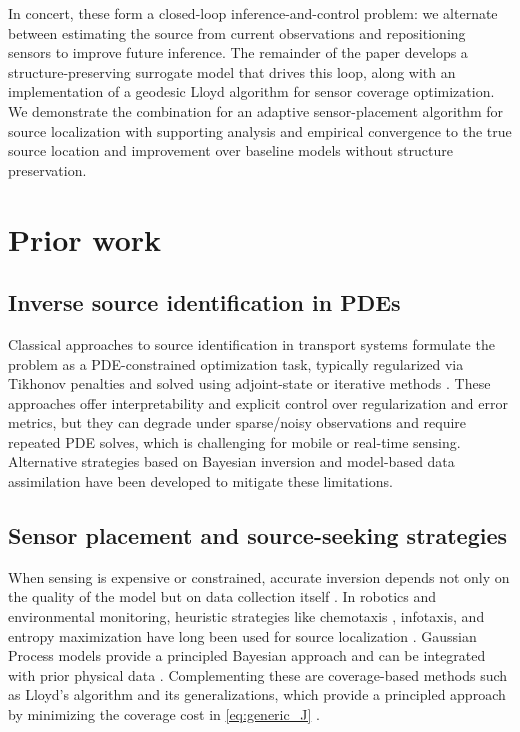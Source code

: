 \documentclass[onefignum,onetabnum]{siamart171218} %
\begin{document}
\noindent In concert, these form a closed-loop inference-and-control problem: we alternate between estimating the source from current observations and repositioning sensors to improve future inference. The remainder of the paper develops a structure-preserving surrogate model that drives this loop, along with an implementation of a geodesic Lloyd algorithm \cite{lloyd1982least, cortes2004coverage} for sensor coverage optimization. We demonstrate the combination for an adaptive sensor-placement algorithm for source localization with supporting analysis and empirical convergence to the true source location and improvement over baseline models without structure preservation.
\section{Prior work}
\label{sec:background}

\subsection{Inverse source identification in PDEs}
\label{sec:background_si}

Classical approaches to source identification in transport systems formulate the problem as a PDE-constrained optimization task, typically regularized via Tikhonov penalties and solved using adjoint-state or iterative methods \cite{chavent2010nonlinear, bakushinsky2005iterative}. These approaches offer interpretability and explicit control over regularization and error metrics, but they can degrade under sparse/noisy observations and require repeated PDE solves, which is challenging for mobile or real-time sensing. Alternative strategies based on Bayesian inversion \cite{tarantola2005inverse, stuart2010inverse} and model-based data assimilation \cite{alpay2000model} have been developed to mitigate these limitations.

\subsection{Sensor placement and source-seeking strategies}
\label{sec:background_sensor_placement}
When sensing is expensive or constrained, accurate inversion depends not only on the quality of the model but on data collection itself \cite{matthes2005source, weimer2009multiple}. In robotics and environmental monitoring, heuristic strategies like chemotaxis \cite{russell2003comparison, marques2002olfaction}, infotaxis, and entropy maximization have long been used for source localization \cite{russell2003comparison, webster2012bioinspired, dhariwal2004bacterium, zarzhitsky2005distributed, soares2015distributed}.
Gaussian Process models provide a principled Bayesian approach and can be integrated with prior physical data \cite{khodayi2019model}.
Complementing these are coverage-based methods such as Lloyd’s algorithm and its generalizations, which provide a principled approach by minimizing the coverage cost in \eqref{eq:generic_J} \cite{hajieghrary2016multi, hajieghrary2017information}.
\end{document}
